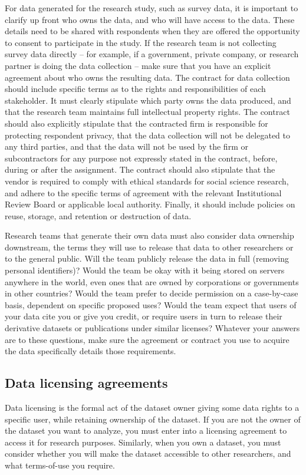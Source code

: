 For data generated for the research study, such as survey data, 
it is important to clarify up front who owns the data,
and who will have access to the data.
These details need to be shared with respondents when they are offered the opportunity 
to consent to participate in the study. 
If the research team is not collecting survey data directly --
for example, if a government, private company, or research partner is doing the data collection --
make sure that you have an explicit agreement
about who owns the resulting data. 
The contract for data collection should include specific terms 
as to the rights and responsibilities of each stakeholder.
It must clearly stipulate which party owns the data produced, 
and that the research team maintains full intellectual property rights. 
The contract should also explicitly stipulate that the contracted firm
is responsible for protecting respondent privacy, 
that the data collection will not be delegated to any third parties,
and that the data will not be used by the firm or subcontractors for any purpose not expressly stated in the contract,
before, during or after the assignment. 
The contract should also stipulate that the vendor is required to comply with 
ethical standards for social science research, 
and adhere to the specific terms of agreement with the relevant 
Institutional Review Board or applicable local authority.
Finally, it should include policies on reuse, storage, and retention or destruction of data. 

Research teams that generate their own data must also consider data ownership downstream,
the terms they will use to release that data to other researchers or to the general public. 
Will the team publicly release the data in full (removing personal identifiers)?
Would the team be okay with it being stored on servers anywhere in the world,
even ones that are owned by corporations or governments in other countries?
Would the team prefer to decide permission on a case-by-case basis, dependent on specific proposed uses? 
Would the team expect that users of your data cite you or give you credit,
or require users in turn to release
their derivative datasets or publications under similar licenses?
Whatever your answers are to these questions,
make sure the agreement or contract
you use to acquire the data
specifically details those requirements.

\subsection{Data licensing agreements}
Data licensing is the formal act of the dataset owner giving some data rights to a specific user,
while retaining ownership of the dataset.
If you are not the owner of the dataset you want to analyze,
you must enter into a licensing agreement to access it for research purposes.
Similarly, when you own a dataset,
you must consider whether you will make the dataset accessible to other researchers,
and what terms-of-use you require. 

